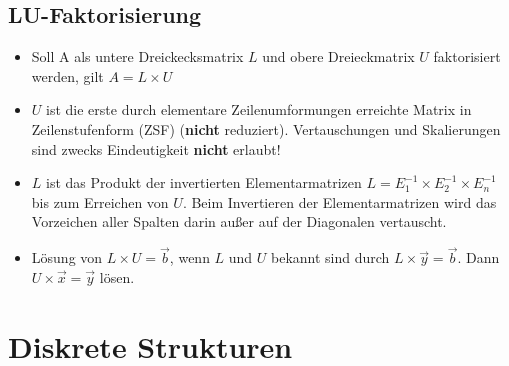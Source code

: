 \documentclass[12pt,landscape]{article}
\begin{document}
\begin{multicols}{3}
\subsection{LU-Faktorisierung}
\begin{itemize}
\item Soll A als untere Dreickecksmatrix $L$ und obere Dreieckmatrix $U$ faktorisiert werden, gilt $A = L \times U$
\item $U$ ist die erste durch elementare Zeilenumformungen erreichte Matrix in Zeilenstufenform (ZSF) (\textbf{nicht} reduziert). Vertauschungen und Skalierungen sind zwecks Eindeutigkeit \textbf{nicht} erlaubt!
\item $L$ ist das Produkt der invertierten Elementarmatrizen $L = E_1^{-1} \times E_2^{-1} \times E_n^{-1}$ bis zum Erreichen von $U$. Beim Invertieren der Elementarmatrizen wird das Vorzeichen aller Spalten darin außer auf der Diagonalen vertauscht.
\item Lösung von $L \times U = \vec{b}$, wenn $L$ und $U$ bekannt sind durch $L \times \vec{y} = \vec{b}$. Dann $U \times \vec{x} = \vec{y}$ lösen.
\end{itemize}
\section{Diskrete Strukturen}

\end{multicols}
\end{document}
